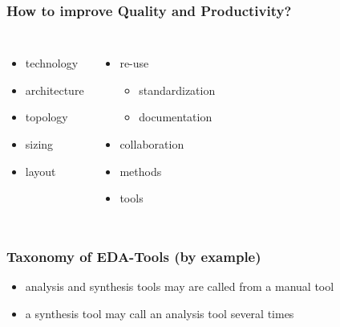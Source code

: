\documentclass[10pt, aspectratio=169]{beamer}
\begin{document}
\begin{frame}
\frametitle{How to improve Quality and Productivity?}
\begin{columns}

\begin{itemize}
  \item technology
  \item architecture
  \item topology
  \item sizing
  \item layout
\end{itemize}

\begin{itemize}
  \item re-use
  \begin{itemize}
    \item standardization
    \item documentation
  \end{itemize}
  \item collaboration
  \item methods
  \item tools
\end{itemize}

\end{columns}
\end{frame}


\begin{frame}
\frametitle{Taxonomy of EDA-Tools (by example)}

\begin{center}
\begin{tikzpicture}

\end{tikzpicture}
\end{center}
\begin{itemize}
  \item analysis and synthesis tools may are called from a manual tool
  \item a synthesis tool may call an analysis tool several times
\end{itemize}
\end{frame}
\end{document}
